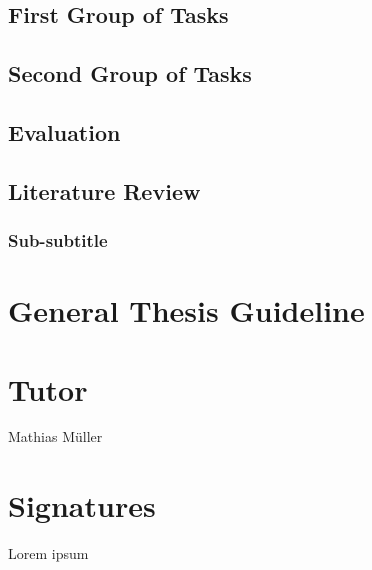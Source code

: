 \documentclass[english]{uzhpub}
\begin{document}
\subsection{First Group of Tasks}
\subsection{Second Group of Tasks}
\subsection{Evaluation}
\subsection{Literature Review}

\subsubsection{Sub-subtitle}


\section{General Thesis Guideline}


\section{Tutor}
Mathias M\"uller

\section{Signatures}
Lorem ipsum



\end{document}
